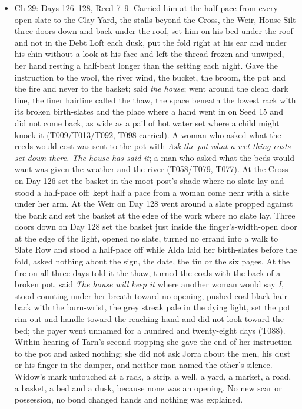\documentclass{design/chronicle}
\begin{document}
{\begin{itemize}[leftmargin=1.4em,itemsep=1pt,topsep=3pt,parsep=0pt]
\item Ch 29: Days 126–128, Reed 7–9. Carried him at the half-pace from every open slate to the Clay Yard, the stalls beyond the Cross, the Weir, House Silt three doors down and back under the roof, set him on his bed under the roof and not in the Debt Loft each dusk, put the fold right at his ear and under his chin without a look at his face and left the thread frozen and unwiped, her hand resting a half-beat longer than the setting each night. Gave the instruction to the wool, the river wind, the bucket, the broom, the pot and the fire and never to the basket; said \emph{the house}; went around the clean dark line, the finer hairline called the thaw, the space beneath the lowest rack with its broken birth-slates and the place where a hand went in on Seed 15 and did not come back, as wide as a pail of hot water set where a child might knock it (T009/T013/T092, T098 carried). A woman who asked what the reeds would cost was sent to the pot with \emph{Ask the pot what a wet thing costs set down there. The house has said it}; a man who asked what the beds would want was given the weather and the river (T058/T079, T077). At the Cross on Day 126 set the basket in the moot-post’s shade where no slate lay and stood a half-pace off; kept half a pace from a woman come near with a slate under her arm. At the Weir on Day 128 went around a slate propped against the bank and set the basket at the edge of the work where no slate lay. Three doors down on Day 128 set the basket just inside the finger’s-width-open door at the edge of the light, opened no slate, turned no errand into a walk to Slate Row and stood a half-pace off while Alda laid her birth-slates before the fold, asked nothing about the sign, the date, the tin or the six pages. At the fire on all three days told it the thaw, turned the coals with the back of a broken pot, said \emph{The house will keep it} where another woman would say \emph{I}, stood counting under her breath toward no opening, pushed coal-black hair back with the burn-wrist, the grey streak pale in the dying light, set the pot rim out and handle toward the reaching hand and did not look toward the bed; the payer went unnamed for a hundred and twenty-eight days (T088). Within hearing of Tarn’s second stopping she gave the end of her instruction to the pot and asked nothing; she did not ask Jorra about the men, his dust or his finger in the damper, and neither man named the other’s silence. Widow’s mark untouched at a rack, a strip, a well, a yard, a market, a road, a basket, a bed and a dusk, because none was an opening. No new scar or possession, no bond changed hands and nothing was explained.


\end{itemize}}
\end{document}
